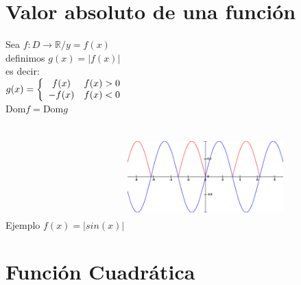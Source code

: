 \section{Valor absoluto de una función}
\hfill
\begin{minipage}{.45\textwidth}
Sea $f:D \longrightarrow \mathbb{R} / y= f(x)$\\
definimos $g(x)=|f(x)|$\\
es decir:\\
$g(x)=\left\{
\begin{array}{c l}
  f(x) & f(x)>0 \\
  -f(x) & f(x)<0
\end{array}
\right.$\\
Dom$f=$Dom$g$

\end{minipage}
\hfill
\begin{minipage}{.45\textwidth}
\begin{center}
Ejemplo $f(x)=|sin(x)|$
\includegraphics[height=4cm,width=6cm]{abssinx.eps} 
\end{center} 
\end{minipage}
\hfill
\section{Función Cuadrática}
